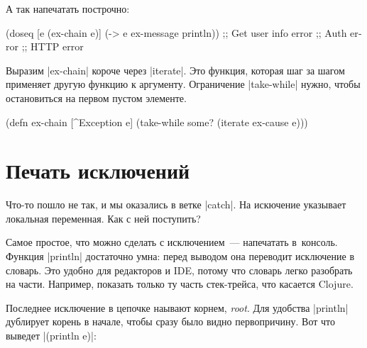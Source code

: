 \noindent
А так напечатать построчно:


\begin{english}
  \begin{clojure}
(doseq [e (ex-chain e)]
  (-> e ex-message println))
;; Get user info error
;; Auth error
;; HTTP error
  \end{clojure}
\end{english}

Выразим \spverb|ex-chain| короче через \spverb|iterate|. Это функция, которая
шаг за шагом применяет другую функцию к аргументу. Ограничение
\spverb|take-while| нужно, чтобы остановиться на первом пустом элементе.

\begin{english}
  \begin{clojure}
(defn ex-chain [^Exception e]
  (take-while some? (iterate ex-cause e)))
  \end{clojure}
\end{english}

\section{Печать исключений}

Что-то пошло не так, и мы оказались в ветке \spverb|catch|. На искючение
указывает локальная переменная. Как с ней поступить?

Самое простое, что можно сделать с исключением~--- напечатать в~консоль. Функция
\spverb|println| достаточно умна: перед выводом она переводит исключение в
словарь. Это удобно для редакторов и IDE, потому что словарь легко разобрать на
части. Например, показать только ту часть стек-трейса, что касается Clojure.

Последнее исключение в цепочке наывают корнем, \emph{root}. Для удобства
\spverb|println| дублирует корень в начале, чтобы сразу было видно
первопричину. Вот что выведет \spverb|(println e)|:


\begin{english}
\end{english}

